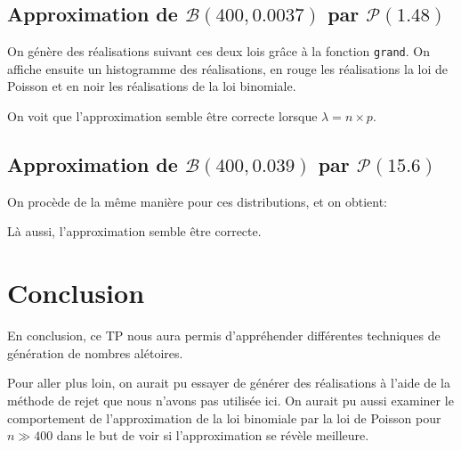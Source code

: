 \documentclass{article}
\begin{document}
\begin{multicols}{2}
\subsection{Approximation de $\mathcal{B}(400, 0.0037)$ par $\mathcal{P}(1.48)$}\label{subsec:ex31}

On génère des réalisations suivant ces deux lois grâce à la fonction
\texttt{grand}. On affiche ensuite un histogramme des réalisations, en rouge les
réalisations la loi de Poisson et en noir les réalisations de la loi binomiale.

On voit que l'approximation semble être correcte lorsque $\lambda = n \times p$.

\subsection{Approximation de $\mathcal{B}(400, 0.039)$ par $\mathcal{P}(15.6)$}\label{subsec:ex31}

On procède de la même manière pour ces distributions, et on obtient:

Là aussi, l'approximation semble être correcte.


\section{Conclusion}\label{sec:conclu}

En conclusion, ce TP nous aura permis d'appréhender différentes techniques de
génération de nombres alétoires.

Pour aller plus loin, on aurait pu essayer de générer des réalisations à l'aide
de la méthode de rejet que nous n'avons pas utilisée ici.
On aurait pu aussi examiner le comportement de l'approximation de la loi
binomiale par la loi de Poisson pour $n \gg 400$ dans le but de voir si
l'approximation se révèle meilleure.


\end{multicols}
\end{document}
